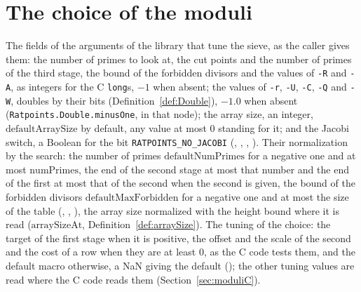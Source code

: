 \section{The choice of the moduli}\label{sec:choice}

\begin{definition}\label{def:sieveOptions}
  \leanok
  The fields of the arguments of the library that tune the sieve, as the caller gives them: the
  number of primes to look at, the cut points and the number of primes of the third stage, the bound
  of the forbidden divisors and the values of \verb|-R| and \verb|-A|, as integers for the C
  \verb|long|s, $-1$ when absent; the values of \verb|-r|, \verb|-U|, \verb|-C|, \verb|-Q| and
  \verb|-W|, doubles by their bits (Definition~\ref{def:Double}), $-1.0$ when absent
  (\verb|Ratpoints.Double.minusOne|, in that node); the array size, an integer,
  $\mathrm{defaultArraySize}$ by default, any value at most $0$ standing for it; and the Jacobi
  switch, a Boolean for the bit \verb|RATPOINTS_NO_JACOBI| (,
  , , ). Their
  normalization by the search: the number of primes $\mathrm{defaultNumPrimes}$ for a negative one
  and at most $\mathrm{numPrimes}$, the end of the second stage at most that number and the end of
  the first at most that of the second when the second is given, the bound of the forbidden divisors
  $\mathrm{defaultMaxForbidden}$ for a negative one and at most the size of the table
  (, ,
  ), the array size normalized with the height bound where it is
  read ($\mathrm{arraySizeAt}$, Definition~\ref{def:arraySize}). The tuning of the choice: the
  target of the first stage when it is positive, the offset and the scale of the second and the cost
  of a row when they are at least $0$, as the C code tests them, and the default macro otherwise, a
  NaN giving the default (); the other tuning values are read
  where the C code reads them (Section~\ref{sec:moduliC}).
\end{definition}

